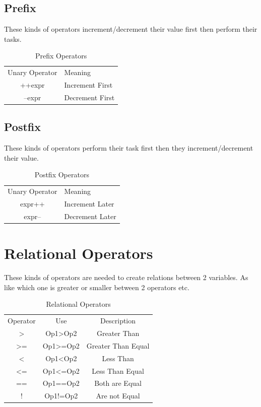 \documentclass[openany]{book}  %
\begin{document}
\begin{flushleft}
    \subsection{Prefix}
    These kinds of operators\cite{Ref8} increment/decrement their value first then perform their tasks.
    \begin{table}[htbp]
        \begin{tabular}{cl}
            Unary Operator & Meaning         \\
            ++expr         & Increment First \\
            --expr         & Decrement First
        \end{tabular}
        \centering
        \caption{Prefix Operators}
    \end{table}
    \subsection{Postfix}
    These kinds of operators\cite{Ref8} perform their task first then they increment/decrement their value.
    \begin{table}[htbp]
        \begin{tabular}{cl}
            Unary Operator & Meaning          \\
            expr++         & Increment  Later \\
            expr--         & Decrement Later
        \end{tabular}
        \centering
        \caption{Postfix Operators}
    \end{table}
    \section{Relational Operators}
    These kinds of operators\cite{Ref8} are needed to create relations between 2 variables. As like which one is greater or smaller between 2 operators etc.
    \begin{table}[htbp]
        \begin{tabular}{ccc}
            Operator        & Use                   & Description        \\
            \textgreater{}  & Op1\textgreater{}Op2  & Greater Than       \\
            \textgreater{}= & Op1\textgreater{}=Op2 & Greater Than Equal \\
            \textless{}     & Op1\textless{}Op2     & Less Than          \\
            \textless{}=    & Op1\textless{}=Op2    & Less Than Equal    \\
            ==              & Op1==Op2              & Both are Equal     \\
            !               & Op1!=Op2              & Are not Equal
        \end{tabular}
        \centering
        \caption{Relational Operators}
    \end{table}


\end{flushleft}
\end{document}
